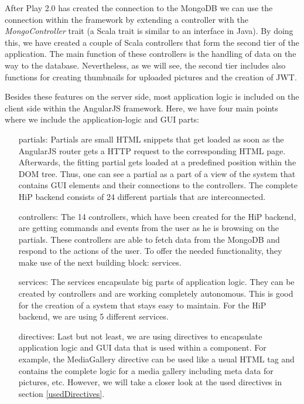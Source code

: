 After Play 2.0 has created the connection to the MongoDB we can use the connection within the framework by extending a controller with the \emph{MongoController} trait (a Scala trait is similar to an interface in Java). By doing this, we have created a couple of Scala controllers that form the second tier of the application. The main function of these controllers is the handling of data on the way to the database. Nevertheless, as we will see, the second tier includes also functions for creating thumbnails for uploaded pictures and the creation of \ac{JWT}. 

Besides these features on the server side, most application logic is included on the client side within the AngularJS framework. Here, we have four main points where we include the application-logic and \ac{GUI} parts:

\begin{itemize}
	\item[partials:] Partials are small \ac{HTML} snippets that get loaded as soon as the AngularJS router gets a \ac{HTTP} request to the corresponding \ac{HTML} page. Afterwards, the fitting partial gets loaded at a predefined position within the \ac{DOM} tree. Thus, one can see a partial as a part of a view of the system that contains \ac{GUI} elements and their connections to the controllers.  The complete \ac{HiP} backend consists of 24 different partials that are interconnected.  
	\item[controllers:] The 14 controllers, which have been created for the \ac{HiP} backend, are getting commands and events from the user as he is browsing on the partials. These controllers are able to fetch data from the MongoDB and respond to the actions of the user. To offer the needed functionality, they make use of the next building block: services.  
	\item[services:] The services encapsulate big parts of application logic. They can be created by controllers and are working completely autonomous. This is good for the creation of a system that stays easy to maintain. For the \ac{HiP} backend, we are using 5 different services.
	\item[directives:] Last but not least, we are using directives to encapsulate application logic and \ac{GUI} data that is used within a component. For example, the MediaGallery directive can be used like a usual \ac{HTML} tag and contains the complete logic for a media gallery including meta data for pictures, etc. However, we will take a closer look at the used directives in section \ref{usedDirectives}.
\end{itemize}

